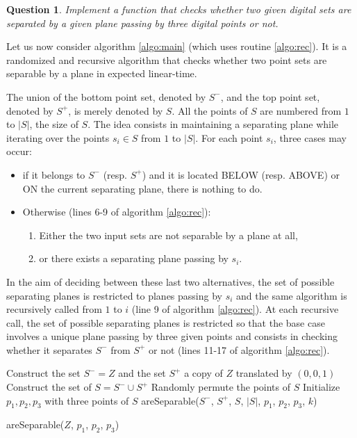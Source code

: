 \documentclass[a4paper, 11pt]{article}
\newtheorem{qu}{Question}
\begin{document}
\begin{qu}
Implement a function that checks whether two given digital sets are separated by a given plane passing by three
digital points or not.  
\end{qu}

Let us now consider algorithm \ref{algo:main} (which uses routine \ref{algo:rec}). 
It is a randomized and recursive algorithm that checks whether two point sets
 are separable by a plane in expected linear-time. 

The union of the bottom point set, denoted by $S^-$, and the top point set, denoted by $S^+$, is 
merely denoted by $S$. All the points of $S$ are numbered from $1$ to $|S|$, the size of $S$.    
The idea consists in maintaining a separating plane while iterating over the points $s_i \in S$ from $1$ to $|S|$. 
For each point $s_i$, three cases may occur:  
\begin{itemize}
 \item if it belongs to $S^-$ (resp. $S^+$) and it is located BELOW (resp. ABOVE) or ON 
the current separating plane, there is nothing to do. 
 \item Otherwise (lines 6-9 of algorithm \ref{algo:rec}): 
 \begin{enumerate}
   \item Either the two input sets are not separable by a plane at all,  
   \item or there exists a separating plane passing by $s_i$. 
 \end{enumerate}
\end{itemize}
In the aim of deciding between these last two alternatives, the set of possible separating 
planes is restricted to planes passing by $s_i$ and the same algorithm is recursively called
from $1$ to $i$ (line 9 of algorithm \ref{algo:rec}). 
At each recursive call, the set of possible separating planes is restricted so that the base case 
involves a unique plane passing by three given points and consists in checking whether it separates 
$S^-$ from $S^+$ or not (lines 11-17 of algorithm \ref{algo:rec}).  


\begin{algorithm}[Hhtbp]
  Construct the set $S^- = Z$ and the set $S^+$ a copy of $Z$ translated by $(0,0,1)$ \; 
  Construct the set of $S = S^- \cup S^+$ \; 
  Randomly permute the points of $S$ \;
  Initialize $p_1, p_2, p_3$ with three points of $S$ 
  \Return areSeparable($S^-$, $S^+$, $S$, $|S|$, $p_1$, $p_2$, $p_3$, $k$) \; 
  \caption{areSeparable($Z$, $p_1$, $p_2$, $p_3$)}
  \label{algo:main}
\end{algorithm}
\end{document}
